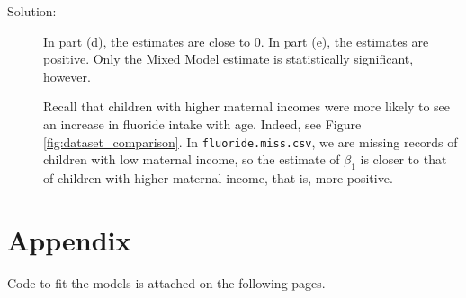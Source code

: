 \documentclass[11pt, letterpaper]{article}
\begin{document}
\begin{enumerate}[(a)]
\begin{description}
\item[Solution:] In part (d), the estimates are close to $0$. In part (e), the
  estimates are positive. Only the Mixed Model estimate is statistically
  significant, however.

  Recall that children with higher maternal incomes were more likely to see an
  increase in fluoride intake with age. Indeed, see Figure
  \ref{fig:dataset_comparison}. In \texttt{fluoride.miss.csv}, we are missing
  records of children with low maternal income, so the estimate of $\beta_1$ is
  closer to that of children with higher maternal income, that is, more
  positive.
\end{description}

\end{enumerate}

\section*{Appendix}

Code to fit the models is attached on the following pages.

\FloatBarrier


\end{document}
